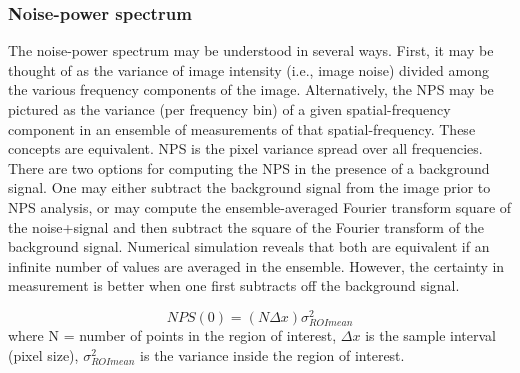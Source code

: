 \subsubsection{Noise-power spectrum}
The noise-power spectrum may be understood in several ways.  First, it may be thought of as the variance of image intensity (i.e., image noise) divided among the various frequency components of the image.  Alternatively, the NPS may be pictured as the variance (per frequency bin) of a given spatial-frequency component in an ensemble of measurements of that spatial-frequency.  These concepts are equivalent.
NPS is the pixel variance spread over all frequencies.
There are two options for computing the NPS in the presence of a background signal.  One may either subtract the background signal from the image prior to NPS analysis, or may compute the ensemble-averaged Fourier transform square of the noise+signal and then subtract the square of the Fourier transform of the background signal.  Numerical simulation reveals that both are equivalent if an infinite number of values are averaged in the ensemble.  However, the certainty in measurement is better when one first subtracts off the background signal.

\begin{equation}
NPS(0) = (N \Delta x) \sigma^2_{ROImean}
\end{equation}
where N = number of points in the region of interest, $\Delta x$ is the sample interval (pixel size), $\sigma^2_{ROImean}$ is the variance inside the region of interest.


